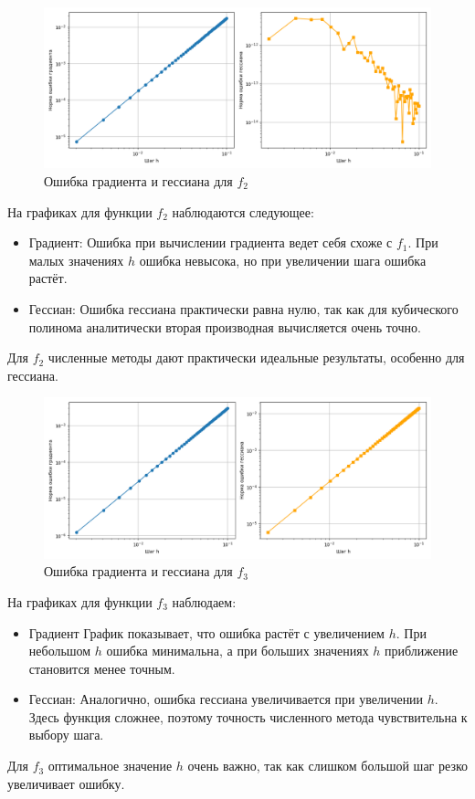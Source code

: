 \documentclass[a4paper,12pt]{article}
\begin{document}
\begin{figure}[H]
    \centering \includegraphics[width=\textwidth]{images/1_f2.png}
    \caption{Ошибка градиента и гессиана для $f_2$}
\end{figure}
\noindent На графиках для функции \( f_2 \) наблюдаются следующее:
\begin{itemize}
    \item Градиент: Ошибка при вычислении градиента ведет себя схоже с \(f_1\). При малых значениях \(h\) ошибка невысока, но при увеличении шага ошибка растёт.
    \item Гессиан: Ошибка гессиана практически равна нулю, так как для кубического полинома аналитически вторая производная вычисляется очень точно.
\end{itemize}
Для \(f_2\) численные методы дают практически идеальные результаты, особенно для гессиана.

\begin{figure}[H]
    \centering \includegraphics[width=\textwidth]{images/1_f3.png}
    \caption{Ошибка градиента и гессиана для $f_3$}
\end{figure}
\noindent На графиках для функции \( f_3 \) наблюдаем:
\begin{itemize}
    \item Градиент График показывает, что ошибка растёт с увеличением \(h\). При небольшом \(h\) ошибка минимальна, а при больших значениях \(h\) приближение становится менее точным.
    \item Гессиан: Аналогично, ошибка гессиана увеличивается при увеличении \(h\). Здесь функция сложнее, поэтому точность численного метода чувствительна к выбору шага.
\end{itemize}
Для \(f_3\) оптимальное значение \(h\) очень важно, так как слишком большой шаг резко увеличивает ошибку.
\end{document}
